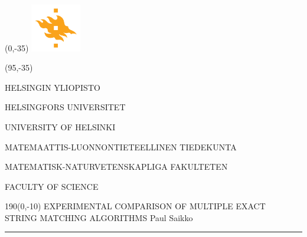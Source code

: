 \documentclass[a4paper]{article} %
\begin{document}
  \pagestyle{empty} %


  \begin{textblock}{95}(0,-35)
    \includegraphics[width=22mm]{flame.pdf}
  \end{textblock}	

  \begin{textblock}{95}(95,-35)
    {\fontsize{8}{7}\selectfont\sffamily\color{unigray}
    \hfill HELSINGIN YLIOPISTO

    \hfill HELSINGFORS UNIVERSITET

    \hfill UNIVERSITY OF HELSINKI

    \color{sciorange}\hfill MATEMAATTIS-LUONNONTIETEELLINEN TIEDEKUNTA

    \hfill MATEMATISK-NATURVETENSKAPLIGA FAKULTETEN

    \hfill FACULTY OF SCIENCE %

    }
  \end{textblock}


  \begin{textblock}{190}(0,-10)
    {\sffamily\huge{\color{sciorange}EXPERIMENTAL COMPARISON }{\color{unigray} OF MULTIPLE EXACT\vspace{1mm}\\STRING MATCHING ALGORITHMS}}
    \small\hfill Paul Saikko\\ %
    \rule[2mm]{190mm}{0.3pt} %
  \end{textblock}
\end{document}
